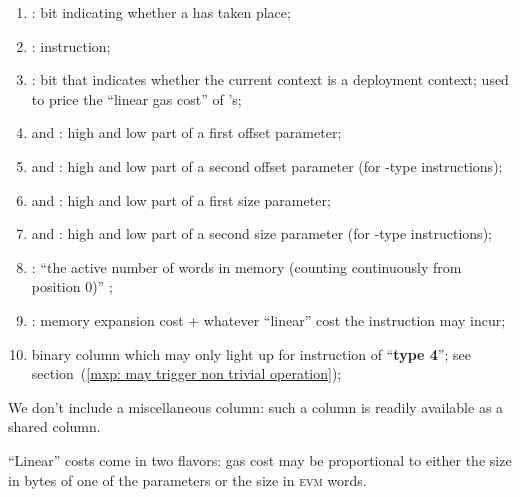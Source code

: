 \begin{enumerate}[resume]
	\item \miscMxpMxpx{}:
		bit indicating whether a \mxpxSH{} has taken place;
	\item \miscMxpInst{}:
		\mxpMod{} instruction; 
	\item \miscMxpCodeDeployment{}:
		bit that indicates whether the current context is a deployment context; used to price the ``linear gas cost'' of 's;
	\item \miscMxpOffsetOneHi{} and \miscMxpOffsetOneLo{}:
		high and low part of a first offset parameter;
	\item \miscMxpOffsetTwoHi{} and \miscMxpOffsetTwoLo{}:
		high and low part of a second offset parameter (for -type instructions);
	\item \miscMxpSizeOneHi{} and \miscMxpSizeOneLo{}:
		high and low part of a first size parameter;
	\item \miscMxpSizeTwoHi{} and \miscMxpSizeTwoLo{}:
		high and low part of a second size parameter (for -type instructions);
	\item \miscMxpWords{}:
		``the active number of words in memory (counting continuously from position $0$)'' ;
	\item \miscMxpGasMxp{}:
		memory expansion cost + whatever ``linear'' cost the instruction may incur;
	\item \miscMxpTypeFourInstMayTriggerMmu{}
		binary column which may only light up for \mxpMod{} instruction of ``\textbf{type 4}'';
		see section~(\ref{mxp: may trigger non trivial operation});
\end{enumerate}
\saNote{} We don't include a miscellaneous \mxpStamp{} column: such a column is readily available as a shared column.

\saNote{} ``Linear'' costs come in two flavors: gas cost may be proportional to either the size in bytes of one of the parameters or the size in \textsc{evm} words.

